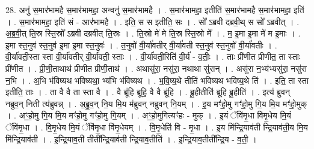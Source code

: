 \documentclass[17pt]{extarticle}
\begin{document}
28. अनु॑ स॒मार॑भामहै स॒मार॑भामहा॒ अन्वनु॑ स॒मार॑भामहै । . स॒मार॑भामहा॒ इतीति॑ स॒मार॑भामहै स॒मार॑भामहा॒ इति॑ । . स॒मार॑भामहा॒ इति॑ सं - आर॑भामहै । . इति॒ स स इतीति॒ सः । . सो᳚ ऽब्रवी दब्रवी॒थ् स सो᳚ ऽब्रवीत् । . अ॒ब्र॒वी॒त् ति॒स्र स्ति॒स्रो᳚ ऽब्रवी दब्रवीत् ति॒स्रः । . ति॒स्रो मे॑ मे ति॒स्र स्ति॒स्रो मे᳚ । . म॒ इ॒मा इ॒मा मे॑ म इ॒माः । . इ॒मा स्त॒नुव॑ स्त॒नुव॑ इ॒मा इ॒मा स्त॒नुवः॑ । . त॒नुवो॑ वी॒र्या॑वतीर् वी॒र्या॑वती स्त॒नुव॑ स्त॒नुवो॑ वी॒र्या॑वतीः । . वी॒र्या॑वती॒स्ता स्ता वी॒र्या॑वतीर् वी॒र्या॑वती॒ स्ताः । . वी॒र्या॑वती॒रिति॑ वी॒र्य॑ - व॒तीः॒ । . ताः प्री॑णीत प्रीणीत॒ ता स्ताः प्री॑णीत । . प्री॒णी॒ताथाथ॑ प्रीणीत प्रीणी॒ताथ॑ । . अथासु॑रा॒ नसु॑रा॒ नथाथा सु॑रान् । . असु॑रा न॒भ्य॑भ्यसु॑रा॒ नसु॑रा न॒भि । . अ॒भि भ॑विष्यथ भविष्यथा॒ भ्य॑भि भ॑विष्यथ । . भ॒वि॒ष्य॒थे तीति॑ भविष्यथ भविष्य॒थे ति॑ । . इति॒ ता स्ता इतीति॒ ताः । . ता वै वै ता स्ता वै । . वै ब्रू॑हि ब्रूहि॒ वै वै ब्रू॑हि । . ब्रू॒हीतीति॑ ब्रूहि ब्रू॒हीति॑ । . इत्य॑ ब्रुवन् नब्रुव॒न् निती त्य॑ब्रुवन्न् । . अ॒ब्रु॒व॒न् नि॒य मि॒य म॑ब्रुवन् नब्रुवन् नि॒यम् । . इ॒य मꣳ॑हो॒मु गꣳ॑हो॒मु गि॒य मि॒य मꣳ॑हो॒मुक् । . अꣳ॒॒हो॒मु गि॒य मि॒य मꣳ॑हो॒मु गꣳ॑हो॒मु गि॒यम् । . अꣳ॒॒हो॒मुगित्यꣳ॑हः - मुक् । . इ॒यं ॅवि॑मृ॒धा वि॑मृ॒धेय मि॒यं ॅवि॑मृ॒धा । . वि॒मृ॒धेय मि॒यं ॅवि॑मृ॒धा वि॑मृ॒धेयम् । . वि॒मृ॒धेति॑ वि - मृ॒धा । . इ॒य मि॑न्द्रि॒याव॑ती न्द्रि॒याव॑ती॒य मि॒य मि॑न्द्रि॒याव॑ती । . इ॒न्द्रि॒याव॒ती तीती᳚न्द्रि॒याव॑ती न्द्रि॒याव॒तीति॑ । . इ॒न्द्रि॒याव॒तीती᳚न्द्रि॒य - व॒ती॒ । \newline
\end{document}
